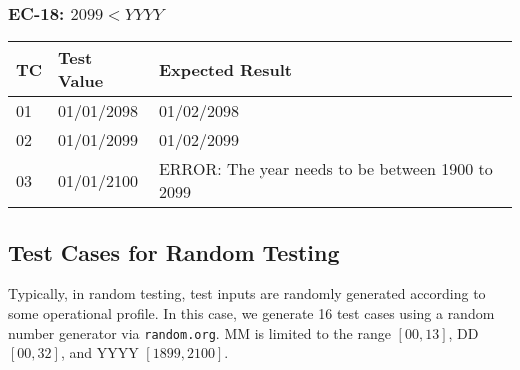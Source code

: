 \documentclass[11pt, oneside]{article}   	%
\begin{document}
\subsubsection{EC-18: $2099 < YYYY$}
\begin{table}[H]
\begin{tabular}{|l|l|l|}
\hline
TC & Test Value & Expected Result                                  \\ \hline
01 & 01/01/2098 & 01/02/2098                                       \\ \hline
02 & 01/01/2099 & 01/02/2099                                       \\ \hline
03 & 01/01/2100 & ERROR: The year needs to be between 1900 to 2099 \\ \hline
\end{tabular}
\end{table}

\subsection{Test Cases for Random Testing}
Typically, in random testing, test inputs are randomly generated according to some operational profile. In this case, we generate 16 test cases using a random number generator via \texttt{random.org}. MM is limited to the range $[00, 13]$, DD $[00, 32]$, and YYYY $[1899, 2100]$.
\end{document}
